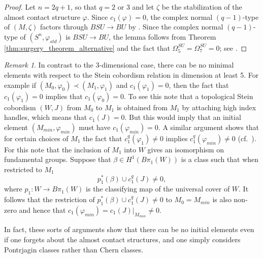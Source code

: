 \documentclass[12pt]{amsart}
\newcommand\scxs{\zeta}					%
\theoremstyle{remark}
\newtheorem{Remark}[Theorem]{Remark}
\begin{document}
\begin{proof}
Let $n = 2q{+}1$, so that $q = 2$ or $3$ and let $\scxs$ be the stabilization of the almost
contact structure
$\varphi$.
Since $c_1(\varphi) = 0$, the complex normal $(q{-}1)$-type of $(M, \scxs)$ %
factors through
$BSU \to BU$ by \cite[Lemma 2.22 (ii), Lemma 2.23]{BCS2}.
Since the complex normal $(q{-}1)$-type of $(S^n,\varphi_{std})$ is $BSU \to BU$,
the lemma follows from Theorem
\ref{thm:surgery_theorem_alternative} and the fact that 
$\Omega_5^{SU} = \Omega_7^{SU}= 0$; see \cite[p.\,248]{Stong1}.
\end{proof}
\begin{Remark}
 In contrast to the 3-dimensional case, there can be no minimal
 elements with respect to the Stein cobordism relation in dimension at
 least 5. For example if $(M_0, \varphi _0) \prec (M_1, \varphi _1)$ and $c_1(\varphi_1) = 0$, then the
 fact that $c_1(\varphi_1) = 0$ implies that $c_1(\varphi_0) =0$. To see this note that a topological Stein cobordism $(W,J)$ from $M_0$ to $M_1$ is obtained from $M_1$ by attaching high index
 handles, which means that $c_1(J) = 0$. But this would imply that an
 initial element $(M_{min},\varphi_{min}) $ must have $c_1(\varphi_{min})
 = 0$. A similar argument shows that for certain choices of $M_1$ the
 fact that $c^q_1(\varphi_1) \neq 0$ implies $c^q_1(\varphi_{min}) \neq 0$
 (cf.\ \cite[Proposition 6.2]{BCS2}). For this note that the inclusion
 of $M_1$ into $W$ gives an isomorphism on fundamental groups.
Suppose that $\beta \in H^1(B \pi_1(W))$ is a class such that when restricted to $M_1$
\[
p^*_1(\beta) \cup c^q_1(J)\neq 0, 
\] 
where $p_1\colon W \longrightarrow B \pi_1(W)$ is the classifying map
of the universal cover of $W$.
It follows that the restriction of $p^*_1(\beta) \cup c^q_1(J)\neq 0$ to $M_0=M_{min}$ is also non{-}zero and hence that $c_1(\varphi_{min}) = c_1(J)|_{M_{min}} \neq 0$.

In fact, these sorts of arguments show that there can be
no initial elements even if one forgets about the almost contact
structures, and one simply considers Pontrjagin classes rather than Chern
classes.
\end{Remark}
\end{document}
